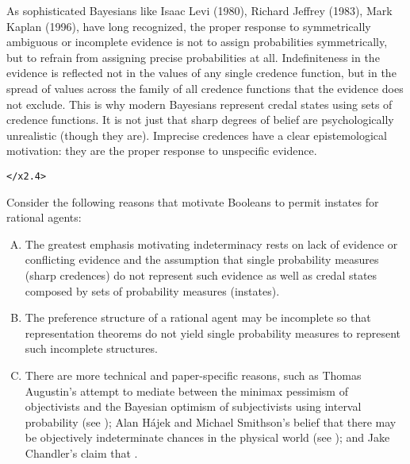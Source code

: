 \documentclass[11pt]{article}
\begin{document}
\begin{quotex}
  As sophisticated Bayesians like Isaac Levi (1980), Richard Jeffrey
  (1983), Mark Kaplan (1996), have long recognized, the proper
  response to symmetrically ambiguous or incomplete evidence is not to
  assign probabilities symmetrically, but to refrain from assigning
  precise probabilities at all. Indefiniteness in the evidence is
  reflected not in the values of any single credence function, but in
  the spread of values across the family of all credence functions
  that the evidence does not exclude. This is why modern Bayesians
  represent credal states using sets of credence functions. It is not
  just that sharp degrees of belief are psychologically unrealistic
  (though they are). Imprecise credences have a clear epistemological
  motivation: they are the proper response to unspecific evidence.
\end{quotex}

\texttt{</x2.4>}

Consider the following reasons that motivate Booleans to permit
instates for rational agents:

\begin{enumerate}[(A)]
\item The greatest emphasis motivating indeterminacy rests on lack of
  evidence or conflicting evidence and the assumption that single
  probability measures (sharp credences) do not represent such
  evidence as well as credal states composed by sets of probability
  measures (instates).
\item The preference structure of a rational agent may be incomplete
  so that representation theorems do not yield single probability
  measures to represent such incomplete structures.
\item There are more technical and paper-specific reasons, such as
  Thomas Augustin's attempt to mediate between the minimax pessimism
  of objectivists and the Bayesian optimism of subjectivists using
  interval probability (see ); Alan
  H{\'a}jek and Michael Smithson's belief that there may be
  objectively indeterminate chances in the physical world (see
  ); and Jake Chandler's claim that
   .
\end{enumerate}
\end{document}
